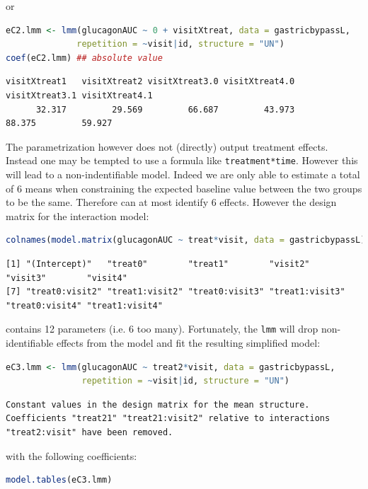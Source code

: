 \documentclass[12pt]{article}
\begin{document}
or
\begin{lstlisting}[language=r,numbers=none]
eC2.lmm <- lmm(glucagonAUC ~ 0 + visitXtreat, data = gastricbypassL,
              repetition = ~visit|id, structure = "UN")
coef(eC2.lmm) ## absolute value
\end{lstlisting}

\label{}
\begin{verbatim}
visitXtreat1   visitXtreat2 visitXtreat3.0 visitXtreat4.0 visitXtreat3.1 visitXtreat4.1 
      32.317         29.569         66.687         43.973         88.375         59.927
\end{verbatim}


The parametrization however does not (directly) output treatment
effects. Instead one may be tempted to use a formula like
\texttt{treatment*time}. However this will lead to a non-indentifiable
model. Indeed we are only able to estimate a total of 6 means when
constraining the expected baseline value between the two groups to be
the same. Therefore can at most identify 6 effects. However the design
matrix for the interaction model:
\begin{lstlisting}[language=r,numbers=none]
colnames(model.matrix(glucagonAUC ~ treat*visit, data = gastricbypassL))
\end{lstlisting}

\label{}
\begin{verbatim}
[1] "(Intercept)"   "treat0"        "treat1"        "visit2"        "visit3"        "visit4"       
[7] "treat0:visit2" "treat1:visit2" "treat0:visit3" "treat1:visit3" "treat0:visit4" "treat1:visit4"
\end{verbatim}


contains 12 parameters (i.e. 6 too many). Fortunately, the \texttt{lmm} will
 drop non-identifiable effects from the model and fit the resulting
 simplified model:
\begin{lstlisting}[language=r,numbers=none]
eC3.lmm <- lmm(glucagonAUC ~ treat2*visit, data = gastricbypassL,
               repetition = ~visit|id, structure = "UN")
\end{lstlisting}

\label{}
\begin{verbatim}
Constant values in the design matrix for the mean structure.
Coefficients "treat21" "treat21:visit2" relative to interactions "treat2:visit" have been removed.
\end{verbatim}


with the following coefficients:
\begin{lstlisting}[language=r,numbers=none]
model.tables(eC3.lmm)
\end{lstlisting}
\end{document}
